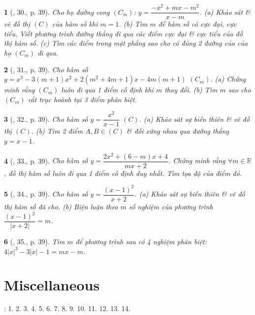 \documentclass{article}
\newtheorem{baitoan}{}
\begin{document}
\begin{baitoan}[\cite{TLCT_giai_tich_12}, 30., p. 39]
	Cho họ đường cong $(C_m)$: $y = \dfrac{-x^2 + mx - m^2}{x - m}$. (a) Khảo sát \& vẽ đồ thị $(C)$ của hàm số khi $m = 1$. (b) Tìm $m$ để hàm số có cực đại, cực tiểu. Viết phương trình đường thẳng đi qua các điểm cực đại \& cực tiểu của đồ thị hàm số. (c) Tìm các điểm trong mặt phẳng sao cho có đúng 2 đường của của họ $(C_m)$ đi qua.	
\end{baitoan}

\begin{baitoan}[\cite{TLCT_giai_tich_12}, 31., p. 39]
	Cho hàm số $y = x^3 - 3(m + 1)x^2 + 2(m^2 + 4m + 1)x - 4m(m + 1)$ $(C_m)$. (a) Chứng minh rằng $(C_m)$ luôn đi qua 1 điểm cố định khi $m$ thay đổi. (b) Tìm $m$ sao cho $(C_m)$ cắt trục hoành tại 3 điểm phân biệt.	
\end{baitoan}

\begin{baitoan}[\cite{TLCT_giai_tich_12}, 32., p. 39]
	Cho hàm số $y = \dfrac{x^2}{x - 1}$ $(C)$. (a) Khảo sát sự biến thiên \& vẽ đồ thị $(C)$. (b) Tìm 2 điểm $A,B\in(C)$ \& đối xứng nhau qua đường thẳng $y = x - 1$.	
\end{baitoan}

\begin{baitoan}[\cite{TLCT_giai_tich_12}, 33., p. 39]
	Cho hàm số $y = \dfrac{2x^2 + (6 - m)x + 4}{mx + 2}$. Chứng minh rằng $\forall m\in\mathbb{R}$, đồ thị hàm số luôn đi qua 1 điểm cố định duy nhất. Tìm tọa độ của điểm đó.
\end{baitoan}

\begin{baitoan}[\cite{TLCT_giai_tich_12}, 34., p. 39]
	Cho hàm số $y = \dfrac{(x - 1)^2}{x + 2}$. (a) Khảo sát sự biến thiên \& vẽ đồ thị hàm số đã cho. (b) Biện luận theo $m$ số nghiệm của phương trình $\dfrac{(x - 1)^2}{|x + 2|} = m$.	
\end{baitoan}

\begin{baitoan}[\cite{TLCT_giai_tich_12}, 35., p. 39]
	Tìm $m$ để phương trình sau có 4 nghiệm phân biệt: $4|x|^3 - 3|x| - 1 = mx - m$.
\end{baitoan}


\section{Miscellaneous}
\cite[BTCCI, pp. 45--48]{SGK_Toan_12_CD_tap_1}: 1. 2. 3. 4. 5. 6. 7. 8. 9. 10. 11. 12. 13. 14.
\end{document}

